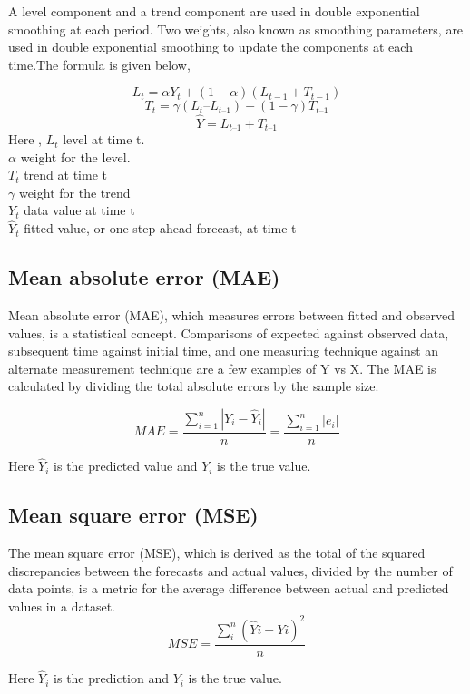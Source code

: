 \documentclass{article}
\begin{document}
A level component and a trend component are used in double exponential
smoothing at each period. Two weights, also known as smoothing
parameters, are used in double exponential smoothing to update the
components at each time.The formula is given below,

\[
L_{t} = \alpha Y_{t} + (1-\alpha)(L_{t-1} + T_{t-1})
\] \[
T_t = \gamma (L_{t}–L_{t–1}) + (1-\gamma) T_{t–1} 
\] \[
\hat Y= L_{t–1} + T_{t–1}
\] Here , \(L_t\) level at time t.\\
\(\alpha\) weight for the level.\\
\(T_t\) trend at time t\\
\(\gamma\) weight for the trend\\
\(Y_t\) data value at time t\\
\(\hat Y_t\) fitted value, or one-step-ahead forecast, at time t\\

\hypertarget{mean-absolute-error-mae}{%
\subsection{Mean absolute error (MAE)}\label{mean-absolute-error-mae}}

Mean absolute error (MAE), which measures errors between fitted and
observed values, is a statistical concept. Comparisons of expected
against observed data, subsequent time against initial time, and one
measuring technique against an alternate measurement technique are a few
examples of Y vs X. The MAE is calculated by dividing the total absolute
errors by the sample size.

\[
MAE = \frac{\sum_{i=1}^{n} |Y_i - \hat Y_i|}{n}=\frac{\sum_{i=1}^{n}|e_i|}{n}
\]

Here \(\hat Y_i\) is the predicted value and \(Y_i\) is the true value.

\hypertarget{mean-square-error-mse}{%
\subsection{Mean square error (MSE)}\label{mean-square-error-mse}}

The mean square error (MSE), which is derived as the total of the
squared discrepancies between the forecasts and actual values, divided
by the number of data points, is a metric for the average difference
between actual and predicted values in a dataset. \[
MSE = \frac{\sum_{i}^{n} (\hat Yi - Yi)^2}{n}
\]

Here \(\hat Y_i\) is the prediction and \(Y_i\) is the true value.
\end{document}
